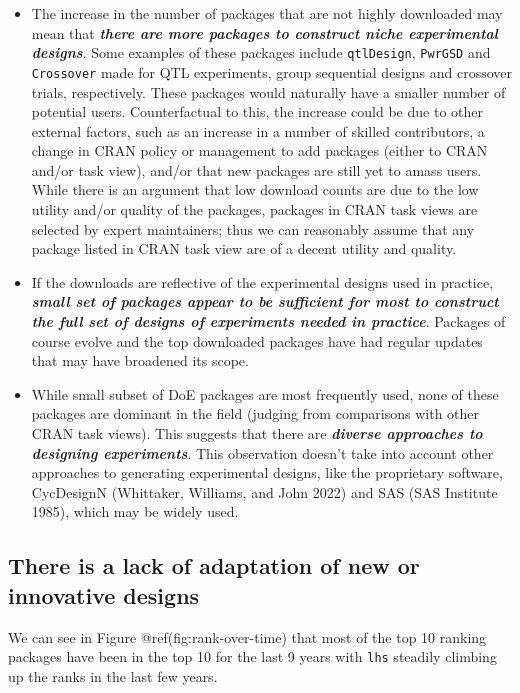 \documentclass{article}
\providecommand{\tightlist}{%
  \setlength{\itemsep}{0pt}\setlength{\parskip}{0pt}}
\def\tightlist{}
\begin{document}
\begin{itemize}
\tightlist
\item
  The increase in the number of packages that are not highly downloaded
  may mean that \textbf{\emph{there are more packages to construct niche
  experimental designs}}. Some examples of these packages include
  \texttt{qtlDesign}, \texttt{PwrGSD} and \texttt{Crossover} made for
  QTL experiments, group sequential designs and crossover trials,
  respectively. These packages would naturally have a smaller number of
  potential users. Counterfactual to this, the increase could be due to
  other external factors, such as an increase in a number of skilled
  contributors, a change in CRAN policy or management to add packages
  (either to CRAN and/or task view), and/or that new packages are still
  yet to amass users. While there is an argument that low download
  counts are due to the low utility and/or quality of the packages,
  packages in CRAN task views are selected by expert maintainers; thus
  we can reasonably assume that any package listed in CRAN task view are
  of a decent utility and quality.
\item
  If the downloads are reflective of the experimental designs used in
  practice, \textbf{\emph{small set of packages appear to be sufficient
  for most to construct the full set of designs of experiments needed in
  practice}}. Packages of course evolve and the top downloaded packages
  have had regular updates that may have broadened its scope.
\item
  While small subset of DoE packages are most frequently used, none of
  these packages are dominant in the field (judging from comparisons
  with other CRAN task views). This suggests that there are
  \textbf{\emph{diverse approaches to designing experiments}}. This
  observation doesn't take into account other approaches to generating
  experimental designs, like the proprietary software, CycDesignN
  (Whittaker, Williams, and John 2022) and SAS (SAS Institute 1985),
  which may be widely used.
\end{itemize}

\hypertarget{ranking}{%
\subsection{There is a lack of adaptation of new or innovative
designs}\label{ranking}}

We can see in Figure @ref(fig:rank-over-time) that most of the top 10
ranking packages have been in the top 10 for the last 9 years with
\texttt{lhs} steadily climbing up the ranks in the last few years.
\end{document}
